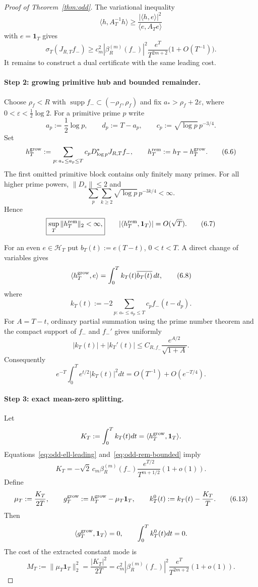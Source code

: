 \begin{proof}[Proof of Theorem~\ref{thm:odd}]
The variational inequality
\[
 \langle h,A_T^{-1}h\rangle
 \ge\frac{|\langle h,e\rangle|^2}{\langle e,A_Te\rangle}
\]
with $e=\mathbf1_T$ gives
\[
 \sigma_T(J_{R,T}f_-)
 \ge c_m^2|\beta_R^{(m)}(f_-)|^2
 \frac{e^T}{T^{2m+2}}\bigl(1+O(T^{-1})\bigr).
\tag{6.5}\label{eq:odd-lower-sharp}
\]
It remains to construct a dual certificate with the same leading cost.

\paragraph{Step 2: growing primitive hub and bounded remainder.}
Choose $\rho_f<R$ with
$\operatorname{supp}f_-\subset(-\rho_f,\rho_f)$ and fix
$a_*>\rho_f+2\varepsilon$, where
$0<\varepsilon<\frac12\log2$.  For a primitive prime $p$ write
\[
 a_p:=\frac12\log p,
 \qquad
 d_p:=T-a_p,
 \qquad
 c_p:=\sqrt{\log p}\,p^{-3/4}.
\]
Set
\[
 h_T^{\rm grow}
 :=\sum_{p:\,a_*\le a_p\le T}
 c_pD_{\log p}^*J_{R,T}f_-,
 \qquad
 h_T^{\rm rem}:=h_T-h_T^{\rm grow}.
\tag{6.6}\label{eq:odd-hub-split}
\]
The first omitted primitive block contains only finitely many primes.  For all higher
prime powers, $\|D_s\|\le2$ and
\[
 \sum_p\sum_{k\ge2}\sqrt{\log p}\,p^{-3k/4}<\infty.
\]
Hence
\[
 \boxed{\sup_T\|h_T^{\rm rem}\|_2<\infty,}
 \qquad
 |\langle h_T^{\rm rem},\mathbf1_T\rangle|=O(\sqrt T).
\tag{6.7}\label{eq:odd-rem-bounded}
\]

For an even $e\in\mathscr H_T$ put $b_T(t):=e(T-t)$, $0<t<T$.  A direct change of
variables gives
\[
 \langle h_T^{\rm grow},e\rangle
 =\int_0^Tk_T(t)\overline{b_T(t)}\,dt,
\tag{6.8}\label{eq:odd-kernel-pairing}
\]
where
\[
 k_T(t):=-2\sum_{p:\,a_*\le a_p\le T}c_p f_-(t-d_p).
\tag{6.9}\label{eq:odd-kernel}
\]
For $A=T-t$, ordinary partial summation using the prime number theorem and the compact
support of $f_-$ and $f_-'$ gives uniformly
\[
 |k_T(t)|+|k_T'(t)|
 \le C_{R,f_-}\frac{e^{A/2}}{\sqrt{1+A}}.
\tag{6.10}\label{eq:odd-kernel-bound}
\]
Consequently
\[
 e^{-T}\int_0^T e^{t/2}|k_T(t)|^2dt
 =O(T^{-1})+O(e^{-T/4}).
\tag{6.11}\label{eq:odd-kernel-weighted}
\]

\paragraph{Step 3: exact mean-zero splitting.}
Let
\[
 K_T:=\int_0^Tk_T(t)dt
 =\langle h_T^{\rm grow},\mathbf1_T\rangle.
\]
Equations~\eqref{eq:odd-ell-leading} and~\eqref{eq:odd-rem-bounded} imply
\[
 K_T=-\sqrt2\,c_m\beta_R^{(m)}(f_-)
 \frac{e^{T/2}}{T^{m+1/2}}(1+o(1)).
\tag{6.12}\label{eq:odd-KT}
\]
Define
\[
 \mu_T:=\frac{K_T}{2T},
 \qquad
 g_T^{\rm grow}:=h_T^{\rm grow}-\mu_T\mathbf1_T,
 \qquad
 k_T^0(t):=k_T(t)-\frac{K_T}{T}.
\tag{6.13}\label{eq:odd-mean-zero}
\]
Then
\[
 \langle g_T^{\rm grow},\mathbf1_T\rangle=0,
 \qquad
 \int_0^Tk_T^0(t)dt=0.
\]
The cost of the extracted constant mode is
\[
 M_T:=\|\mu_T\mathbf1_T\|_2^2
 =\frac{|K_T|^2}{2T}
 =c_m^2|\beta_R^{(m)}(f_-)|^2
 \frac{e^T}{T^{2m+2}}(1+o(1)).
\tag{6.14}\label{eq:odd-MT}
\]


\end{proof}
